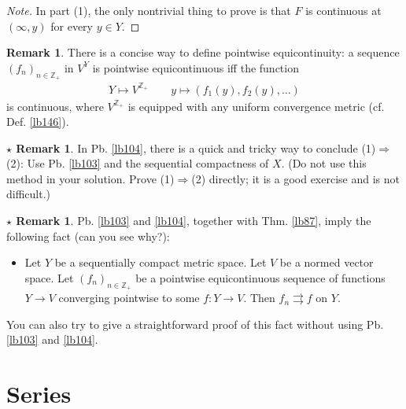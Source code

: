 \documentclass[12pt,b5paper,notitlepage]{article}
\theoremstyle{definition}
\newtheorem{rem}[df]{Remark}
\newtheorem{srem}[df]{$\star$ Remark}
\theoremstyle{plain}
\newcommand{\Zbb}{\mathbb Z}
\numberwithin{equation}{section}
\begin{document}
\begin{proof}[Note]\renewcommand{\qedsymbol}{}
In part (1), the only nontrivial thing to prove  is that $F$ is continuous at $(\infty,y)$ for every $y\in Y$.
\end{proof}





\begin{rem}
There is a concise way to define pointwise equicontinuity: a sequence $(f_n)_{n\in\Zbb_+}$ in $V^Y$ is pointwise equicontinuous iff the function
\begin{gather}
Y\mapsto V^{\Zbb_+}\qquad y\mapsto (f_1(y),f_2(y),\dots)
\end{gather}
is continuous, where $V^{\Zbb_+}$ is equipped with any uniform convergence metric (cf. Def. \ref{lb146}). 
\end{rem}

\begin{srem}
In Pb. \ref{lb104}, there is a quick and tricky way to conclude (1)$\Rightarrow$(2): Use Pb. \ref{lb103} and the sequential compactness of $X$. (Do not use this method in your solution. Prove (1)$\Rightarrow$(2) directly; it is a good exercise and is not difficult.)
\end{srem}



\begin{srem}\label{lb145}
Pb. \ref{lb103} and \ref{lb104}, together with Thm. \ref{lb87}, imply the following fact (can you see why?): 
\begin{itemize}
\item Let $Y$ be a sequentially compact metric space. Let $V$ be a normed vector space. Let $(f_n)_{n\in\Zbb_+}$ be a pointwise equicontinuous sequence of functions $Y\rightarrow V$ converging pointwise to some $f:Y\rightarrow V$. Then $f_n\rightrightarrows f$ on $Y$. 
\end{itemize}
You can also try to give a straightforward proof of this fact without using Pb. \ref{lb103} and \ref{lb104}.
\end{srem}








\newpage




\section{Series}
\end{document}
